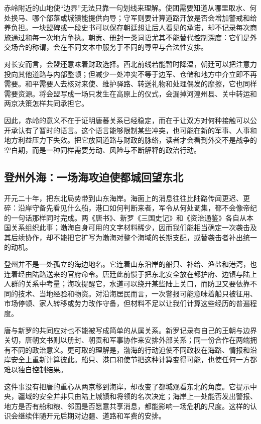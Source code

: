赤岭附近的山地使“边界”无法只靠一句划线来理解。使团需要知道从哪里取水、何处换马、哪个部落或城镇能提供向导；守军则要计算道路开放是否会增加警戒和给养负担。一块盟碑或一段史书可以保存朝廷想让后人看见的承诺，却不记录每次商旅通过和每一次地方争执。朝贡、册封一类词语尤其不能替代控制深度：它们是外交场合的称谓，会在不同文本中服务于不同的尊卑与合法性安排。

对长安而言，会盟还意味着财政选择。西北前线若能暂时降温，朝廷可以把注意力投向其他道路与内部整顿；但减少一处冲突不等于边军、仓储和地方中介立即不再需要。和平需要人去核对来使、维护驿路、转送礼物和处理偶发的摩擦，它也同样需要资源。将会盟写成一场只发生在高原上的仪式，会漏掉河湟州县、关中转运和两京决策怎样共同承担它。

因此，赤岭的意义不在于证明唐蕃关系已经稳定，而在于让双方对何种接触可以公开承认有了暂时的语言。这个语言能够限制某些冲突，也可能在新的军事、人事和地方利益压力下失效。把它放回道路与财政的脉络，读者才会看到外交不是战争的空白期，而是一种同样需要劳动、风险与不断解释的政治行动。

\subsection{登州外海：一场海攻迫使都城回望东北}
开元二十年，把东北局势带到山东海岸。海面上的消息往往比陆路传闻更迟、更碎：沿岸守备先看见什么船，港口如何判断来者，军令从何处调集，都不会像帝纪的一句话那样同时完成。两《唐书》、新罗《三国史记》和《资治通鉴》各自从本国关系组织此事；渤海自身可用的文字材料稀少，因而我们能相当确定一次袭击及其后续协作，却不能把它扩写为渤海对整个海域的长期支配，或替袭击者补出统一的动机。

登州并不是一处孤立的海边地名。它连着山东沿岸的船只、补给、渔盐和港湾，也连着经由陆路送来的官府命令。唐廷此前惯于把东北安全放在都护府、边镇与陆上人群的关系中考量；海攻提醒它，水道可以绕开某些陆上关口，而防卫又要依靠不同的技术、当地经验和物资。对沿海居民而言，一次警报可能意味着船只被征用、市场停顿、家人转移或劳力改作守备，但材料不足以让我们计算这些经历的普遍程度。

唐与新罗的共同应对也不能被写成简单的从属关系。新罗记录有自己的王朝与边界关切，唐朝文书则以册封、朝贡和军事协作来安排外部关系；同一份合作在两端拥有不同的政治意义。更可取的理解是，渤海的行动迫使不同政权在海路、情报和沿岸安全上重新计算彼此。船只、港口和使节把这种计算变得可能，也使任何一方都难以独自控制结果。

这件事没有把唐的重心从两京移到海岸，却改变了都城观看东北的角度。它提示中央，疆域的安全并非只由陆上城镇和将领的名次决定；海岸上一处能否发出警报、地方是否有船和粮、邻国是否愿意共享消息，都能影响一场危机的尺度。这样的认识会继续伴随开元后期对边疆、道路和军费的安排。

